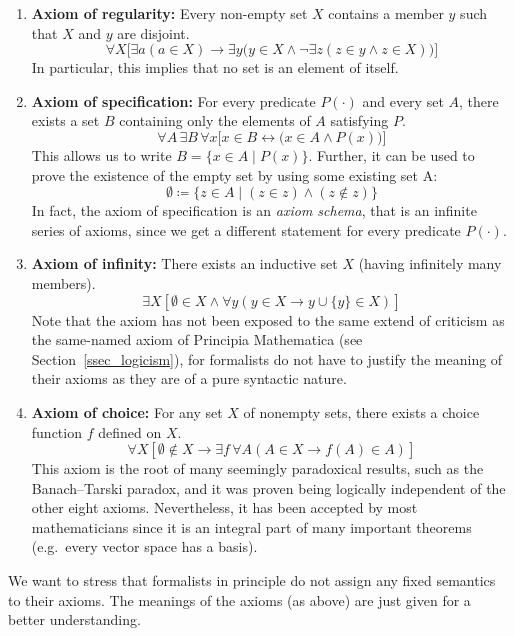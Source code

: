 \documentclass{article}
\begin{document}
\small
\begin{enumerate}
    \item \textbf{Axiom of regularity:} Every non-empty set $X$ contains a member $y$ such that $X$ and $y$ are disjoint.
\begin{equation*}
\forall X \bigl[\exists a ( a \in X) \rightarrow \exists y \bigl( y \in X \land \lnot \exists z (z \in y \land z \in X)\bigr)\bigr]
\end{equation*}
In particular, this implies that no set is an element of itself.
    \item \textbf{Axiom of specification:} For every predicate $P(\cdot)$ and every set $A$, there exists a set $B$ containing only the elements of $A$ satisfying $P$.
\begin{equation*}
\forall A\,\exists B\,\forall x\bigl[x\in B \leftrightarrow \bigl(x\in A \land P(x)\bigr)\bigr]
\end{equation*}
This allows us to write $B=\{x\in A\mid P(x)\}$. Further, it can be used to prove the existence of the empty set by using some existing set A:
\begin{equation*}
\emptyset\coloneqq\{z\in A\mid (z\in z)\land(z\notin z)\}
\end{equation*}
In fact, the axiom of specification is an \textit{axiom schema}, that is an infinite series of axioms, since we get a different statement for every predicate $P(\cdot)$.
    \item \textbf{Axiom of infinity:} There exists an inductive set $X$ (having infinitely many members).
\begin{equation*}
\exists X \left [\emptyset \in X \land \forall y (y \in X \rightarrow y\cup\{y\}  \in X)\right]
\end{equation*}
Note that the axiom has not been exposed to the same extend of criticism as the same-named axiom of Principia Mathematica (see Section~\ref{ssec_logicism}), for formalists do not have to justify the meaning of their axioms as they are of a pure syntactic nature.
    \item \textbf{Axiom of choice:} For any set $X$ of nonempty sets, there exists a choice function $f$ defined on $X$. 
\begin{equation*}
\forall X \left[ \emptyset \notin X \rightarrow \exists f\,\forall A(A\in X\rightarrow f(A) \in A ) \right]
\end{equation*}
This axiom is the root of many seemingly paradoxical results, such as the Banach–Tarski paradox, and it was proven being logically independent of the other eight axioms. Nevertheless, it has been accepted by most mathematicians since it is an integral part of many important theorems (e.g.\ every vector space has a basis).
\end{enumerate}
\normalsize
We want to stress that formalists in principle do not assign any fixed semantics to their axioms. The meanings of the axioms (as above) are just given for a better understanding.
\end{document}
